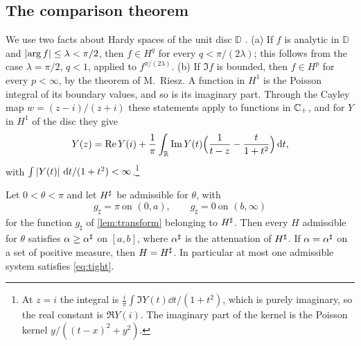 \subsection{The comparison theorem}

We use two facts about Hardy spaces of the unit disc $\mathbb D$
\cite[Chs.~3,~4]{duren}. (a) If $f$ is analytic in $\mathbb D$ and
$\left|\arg f\right|\le\lambda<\pi/2$, then $f\in H^q$ for every $q<\pi/(2\lambda)$; this
follows from the case $\lambda=\pi/2$, $q<1$, applied to $f^{\pi/(2\lambda)}$. (b)
If $\Im f$ is bounded, then $f\in H^p$ for every $p<\infty$, by the theorem of
M.~Riesz. A function in $H^1$ is the Poisson integral of its boundary
values, and so is its imaginary part. Through the Cayley map
$w=(z-i)/(z+i)$ these statements apply to functions in $\mathbb C_{+}$, and for $Y$ in
$H^1$ of the disc they give
\begin{equation}\label{eq:schwarzhalf}
Y(z)=\operatorname{Re} Y(i)+\frac1\pi\int_\mathbb R\operatorname{Im} Y(t)\Big(\frac1{t-z}-\frac t{1+t^2}\Big)\,\mathrm d t ,
\end{equation}
with $\int\left|Y(t)\right|\,\mathrm d t/(1+t^2)<\infty$.\footnote{At $z=i$ the integral is
$\frac i\pi\int\Im Y(t)\dd t/(1+t^2)$, which is purely imaginary, so the real
constant is $\Re Y(i)$. The imaginary part of the kernel is the Poisson
kernel $y/((t-x)^2+y^2)$.}

\begin{proposition}\label{prop:compare}
Let $0<\theta<\pi$ and let $H^{\sharp}$ be admissible for $\theta$, with
\begin{equation}\label{eq:tight}
g_\sharp=\pi\ \text{on }(0,a),\qquad g_\sharp=0\ \text{on }(b,\infty)
\end{equation}
for the function $g_\sharp$ of \cref{lem:transform} belonging to $H^{\sharp}$. Then every
$H$ admissible for $\theta$ satisfies $\alpha\ge{\alpha^{\sharp}}$ on $[a,b]$, where ${\alpha^{\sharp}}$ is
the attenuation of $H^{\sharp}$. If $\alpha={\alpha^{\sharp}}$ on a set of positive measure, then
$H=H^{\sharp}$. In particular at most one admissible system satisfies
\eqref{eq:tight}.
\end{proposition}

